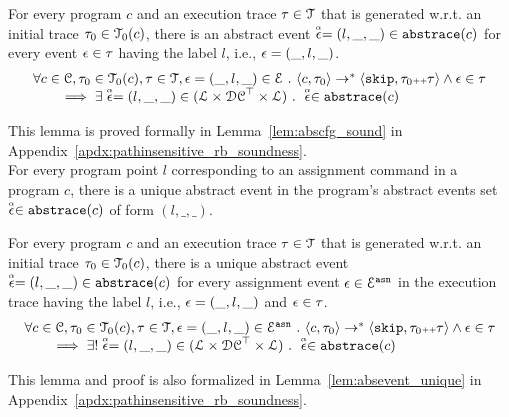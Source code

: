    \begin{lem}
     \label{lem:abscfg_sound}
     For every program $c$ and
     an execution trace $\mathtt{\tau} \in \mathcal{T}$ that is generated w.r.t.
     an initial trace  $\mathtt{\tau}_0 \in \mathcal{T}_0(c)$,
     there is an abstract event $\stackrel{\scriptscriptstyle{\alpha}}{\mathtt{\epsilon}{}} = (l, \_, \_) \in \mathtt{abs}{\mathtt{trace}}(c)$ 
     for every event $\mathtt{\epsilon} \in \mathtt{\tau}$ having the label $l$, i.e., $\mathtt{\epsilon} = (\_, l, \_)$.
   \[
     \begin{array}{l}
       \forall c \in \mathcal{C}, \mathtt{\tau}_0 \in \mathcal{T}_0(c), \mathtt{\tau} \in \mathcal{T} ,  \mathtt{\epsilon} = (\_, l, \_) \in \mathcal{E} ~.~
   \langle {c}, \mathtt{\tau}_0 \rangle \to^{*} \langle \mathtt{skip}, \mathtt{\tau}_0 {\scriptscriptstyle ++} \mathtt{\tau} \rangle 
   \land \mathtt{\epsilon} \in \mathtt{\tau} 
   \\
   \qquad \implies \exists \stackrel{\scriptscriptstyle{\alpha}}{\mathtt{\epsilon}{}} = (l, \_, \_) \in (\mathcal{L}\times \mathcal{DC}^{\top} \times \mathcal{L}) ~.~ 
   \stackrel{\scriptscriptstyle{\alpha}}{\mathtt{\epsilon}{}} \in \mathtt{abs}{\mathtt{trace}}(c)
   \end{array}
   \]
   \end{lem}
This lemma is proved formally in Lemma~\ref{lem:abscfg_sound} in Appendix~\ref{apdx:pathinsensitive_rb_soundness}.
\\
For every program point $l$ corresponding to an assignment command in a program $c$,
there is a unique abstract event in the program's abstract events set $\stackrel{\scriptscriptstyle{\alpha}}{\mathtt{\epsilon}{}} \in \mathtt{abs}{\mathtt{trace}}(c)$ of form $(l, \_, \_)$. 
\begin{lem}
  \label{lem:abscfg_unique}
  For every program $c$ and
  an execution trace $\mathtt{\tau} \in \mathcal{T}$ that is generated w.r.t.
  an initial trace  $\mathtt{\tau}_0 \in \mathcal{T}_0(c)$,
  there is a unique abstract event $\stackrel{\scriptscriptstyle{\alpha}}{\mathtt{\epsilon}{}} = (l, \_, \_) \in \mathtt{abs}{\mathtt{trace}}(c)$ 
  for every assignment event $\mathtt{\epsilon} \in \mathcal{E}^{\mathtt{{asn}}}$ in the
  execution trace having the label $l$, i.e., $\mathtt{\epsilon} = (\_, l, \_)$ and  $\mathtt{\epsilon} \in \mathtt{\tau}$.
%
\[
  \begin{array}{l}
    \forall c \in \mathcal{C}, \mathtt{\tau}_0 \in \mathcal{T}_0(c), \mathtt{\tau} \in \mathcal{T} ,  \mathtt{\epsilon} = (\_, l, \_) \in \mathcal{E}^{\mathtt{{asn}}} ~.~
\langle {c}, \mathtt{\tau}_0 \rangle \to^{*} \langle \mathtt{skip}, \mathtt{\tau}_0 {\scriptscriptstyle ++} \mathtt{\tau} \rangle 
\land \mathtt{\epsilon} \in \mathtt{\tau} 
\\
\qquad \implies \exists! \stackrel{\scriptscriptstyle{\alpha}}{\mathtt{\epsilon}{}} = (l, \_, \_) \in (\mathcal{L}\times \mathcal{DC}^{\top} \times \mathcal{L}) ~.~ 
\stackrel{\scriptscriptstyle{\alpha}}{\mathtt{\epsilon}{}} \in \mathtt{abs}{\mathtt{trace}}(c)
\end{array}
\]
\end{lem}
This lemma and proof is also 
formalized in Lemma~\ref{lem:absevent_unique} in Appendix~\ref{apdx:pathinsensitive_rb_soundness}.

